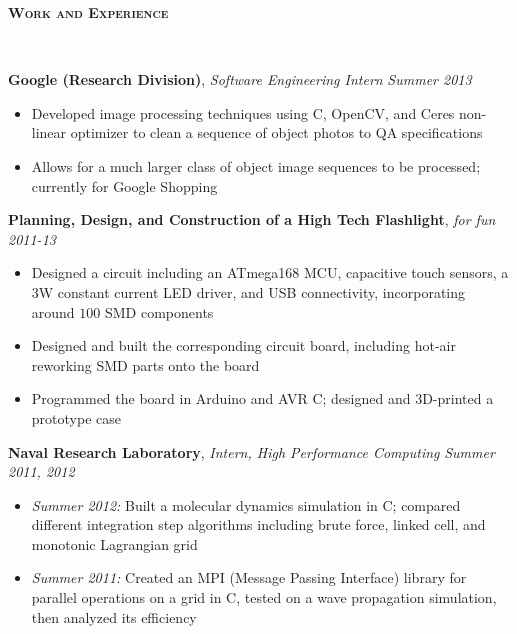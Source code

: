 \documentclass{article}
\newenvironment{changemargin}[2]{%
  \begin{list}{}{%
    \setlength{\topsep}{0pt}%
    \setlength{\leftmargin}{#1}%
    \setlength{\rightmargin}{#2}%
    \setlength{\listparindent}{\parindent}%
    \setlength{\itemindent}{\parindent}%
    \setlength{\parsep}{\parskip}%
  }%
  \item[]}{\end{list}
}
\newcommand{\lineover}{
	\begin{changemargin}{-0.05in}{-0.05in}
		\vspace*{-8pt}
		\hrulefill \\
		\vspace*{-2pt}
	\end{changemargin}
}
\newcommand{\header}[1]{
	\begin{changemargin}{-0.5in}{-0.5in}
		{\large \textbf{\scshape{#1}}}\\
  	\lineover
	\end{changemargin}
}
\newenvironment{body} {
	\vspace*{-16pt}
	\begin{changemargin}{-0.25in}{-0.5in}
  }	
	{\end{changemargin}
}
\newcommand{\CC}{C\nolinebreak\hspace{-.05em}\raisebox{.4ex}{\tiny\bf +}\nolinebreak\hspace{-.10em}\raisebox{.4ex}{\tiny\bf +}}
\begin{document}
\smallskip


\header{Work and Experience}

\begin{body}
	\vspace{14pt}
	\textbf{Google (Research Division)}, \emph{Software Engineering Intern} \hfill \emph{Summer 2013}\\
	\vspace*{-4pt}
	\begin{itemize}
		\item Developed image processing techniques using \CC, OpenCV, and Ceres non-linear optimizer to clean a sequence of object photos to QA specifications
		\item Allows for a much larger class of object image sequences to be processed; currently for Google Shopping
	\end{itemize}
	
	\medskip
	
	\textbf{Planning, Design, and Construction of a High Tech Flashlight}, \emph{for fun} \hfill \emph{2011-13}\\
	\vspace*{-4pt}
	\begin{itemize}
		\item Designed a circuit including an ATmega168 MCU, capacitive touch sensors, a 3W constant current LED driver, and USB connectivity, incorporating around $100$ SMD components
		\item Designed and built the corresponding circuit board, including hot-air reworking SMD parts onto the board
		\item Programmed the board in Arduino and AVR C; designed and 3D-printed a prototype case
	\end{itemize}

	\medskip

	\textbf{Naval Research Laboratory}, \emph{Intern, High Performance Computing} \hfill \emph{Summer 2011, 2012}\\
	\vspace*{-4pt}
	\begin{itemize}
		\item \emph{Summer 2012:} Built a molecular dynamics simulation in C; compared different integration step algorithms including brute force, linked cell, and monotonic Lagrangian grid
		\item \emph{Summer 2011:} Created an MPI (Message Passing Interface) library for parallel operations on a grid in \CC, tested on a wave propagation simulation, then analyzed its efficiency
	\end{itemize}
\end{body}
\end{document}
